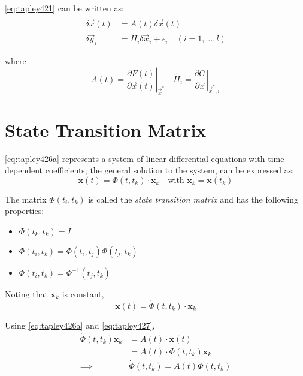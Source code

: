 \ref{eq:tapley421} can be written as:
\begin{align}
  \label{eq:tapley426a}
  \delta \dot{\vec{x}}(t) &= A(t) \delta \vec{x}(t) \\
  \label{eq:tapley426b}
  \delta \vec{y}_i &= \tilde{H}_i \delta \vec{x}_i + {\epsilon}_i \quad (i=1,\ldots,l)
\end{align}

where
\begin{equation}
\label{eq:tapley426ah}
A(t) = \left.\frac{\partial F(t)}{\partial \vec{x} (t)}\right|_{\vec{x}^*} 
\quad
\tilde{H}_i = \left.\frac{\partial G}{\partial \vec{x}}\right|_{\vec{x}^* , i}
\end{equation}

\section{State Transition Matrix}
\ref{eq:tapley426a} represents a system of linear differential equations with time-dependent 
coefficients; the general solution to the system, can be expressed as:
\begin{equation}
\label{eq:tapley427}
  \bm{x}(t) = \Phi (t, t_k) \cdot \bm{x}_k \quad \text{with } \bm{x}_k = \bm{x}(t_k)
\end{equation}

The matrix \(\Phi (t_i, t_k) \) is called the \emph{state transition matrix} and has the 
following properties:
\begin{itemize}
  \item \(\Phi (t_k, t_k) = I \)
  \item \(\Phi (t_i, t_k) = \Phi (t_i, t_j) \Phi (t_j, t_k) \)
  \item \(\Phi (t_i, t_k) = {\Phi}^{-1} (t_j, t_k) \)
\end{itemize}

Noting that \(\bm{x}_k\) is constant,
\begin{equation}
  \label{eq:tapley429}
  \bm{\dot{x}}(t) = \dot{\Phi} (t, t_k) \cdot \bm{x}_k
\end{equation}

Using \ref{eq:tapley426a} and \ref{eq:tapley427},
\begin{equation}
  \label{eq:tapley4210}
  \begin{aligned}
  \dot{\Phi} (t, t_k) \bm{x}_k & = A(t) \cdot \bm{x} (t) \\
  & = A(t) \cdot \Phi (t, t_k) \bm{x}_k \\ 
  \implies & \dot{\Phi} (t, t_k) = A(t) \Phi (t, t_k)
  \end{aligned}
\end{equation}


